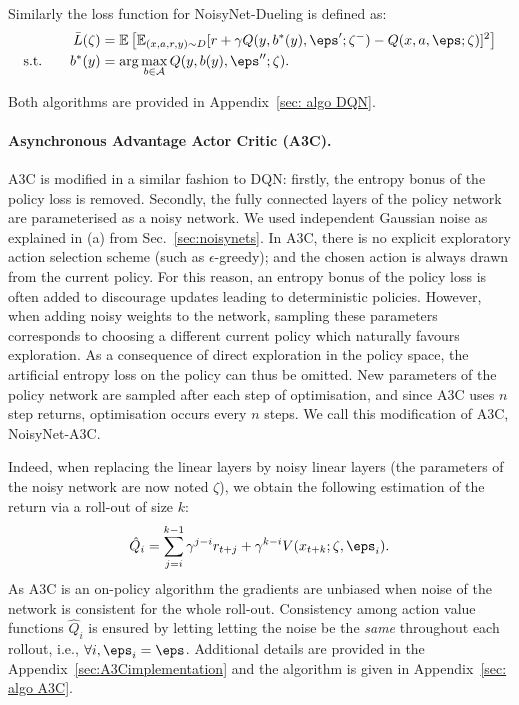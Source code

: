 \documentclass{article}
\newcommand{\algoinit}{NoisyNet}
\begin{document}
Similarly the loss function for \algoinit{}-Dueling is defined as:
 \begin{align}
 \bar L(\zeta)&=\mathbb{E}\left[\mathbb{E}_{(x,a,r,y)\sim D}[r+ \gamma Q(y,b^*(y),\eps';\zeta^-)-Q(x,a,\eps;\zeta)]^2\right]
 \\
 \text{s.t.}\qquad b^*(y)&=\arg\max_{b\in\A}Q(y,b(y),\eps'';\zeta).
 \end{align}
 
 Both algorithms are provided in Appendix~\ref{sec: algo DQN}.


\paragraph{Asynchronous Advantage Actor Critic (A3C).}
A3C is modified in a similar fashion to DQN: firstly, the entropy bonus of the policy loss is removed.
Secondly, the fully connected layers of the policy network are parameterised as a noisy network. We used independent Gaussian noise as explained in (a) from Sec.~\ref{sec:noisynets}.
In A3C, there is no explicit exploratory action selection scheme (such as $\epsilon$-greedy); and the chosen action is always drawn from the current policy. For this reason, an entropy bonus of the policy loss is often added to discourage updates leading to deterministic policies. However, when adding noisy weights to the network, sampling these parameters corresponds to choosing a different current policy which naturally favours exploration.
As a consequence of direct exploration in the policy space, the artificial entropy loss on the policy can thus be omitted. New parameters of the policy network are sampled after each step of optimisation, and since A3C uses $n$ step returns, optimisation occurs every $n$ steps. We call this modification of A3C, \algoinit{}-A3C.


Indeed, when replacing the linear layers by noisy linear layers (the parameters of the noisy network are now noted $\zeta$), we obtain the following estimation of the return via a roll-out of size $k$:
\begin{equation}
\hat{Q}_i=\sum_{j=i}^{k-1}\gamma^{j-i}r_{t+j}+\gamma^{k-i}V(x_{t+k};\zeta,\eps_i).
\end{equation}
As A3C is an on-policy algorithm the gradients are unbiased when noise of the network is consistent for the whole roll-out.
Consistency among action value functions $\hat{Q}_i$ is ensured by letting letting the noise be the \emph{same} throughout each rollout, i.e., $\forall i, \eps_i=\eps$.
Additional details are provided in the Appendix~\ref{sec:A3Cimplementation} and the algorithm is given in Appendix~\ref{sec: algo A3C}.
\end{document}
